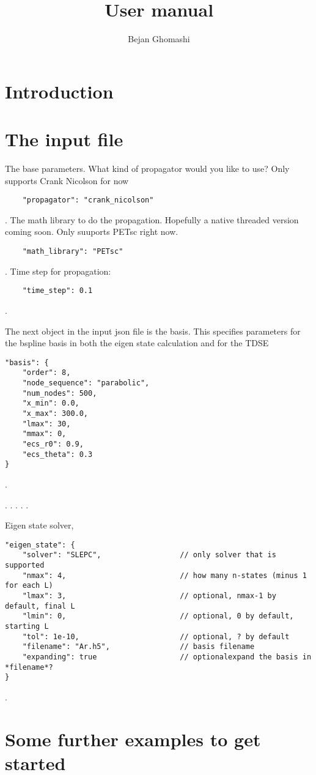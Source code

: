 \documentclass{memoir}
\title{User manual}
\author{Bejan Ghomashi}
\begin{document}
\maketitle

\tableofcontents

\newpage

\section{Introduction}

\cite{AbramowitzStegun}

\section{The input file}
The base parameters. What kind of propagator would you like to use? Only supports Crank Nicolson for now
\begin{lstlisting}
    "propagator": "crank_nicolson"
\end{lstlisting}.
The math library to do the propagation. Hopefully a native threaded version coming soon. Only suuports PETsc right now.
\begin{lstlisting}
    "math_library": "PETsc"
\end{lstlisting}.
Time step for propagation:
\begin{lstlisting}
    "time_step": 0.1
\end{lstlisting}.


The next object in the input json file is the basis. This specifies parameters for the bspline basis in both the eigen state calculation and for the TDSE

\begin{lstlisting}
"basis": {
    "order": 8,
    "node_sequence": "parabolic",
    "num_nodes": 500,
    "x_min": 0.0,
    "x_max": 300.0,
    "lmax": 30,
    "mmax": 0,
    "ecs_r0": 0.9,
    "ecs_theta": 0.3
}
\end{lstlisting}.


.
.
.
.
.

Eigen state solver,
\begin{lstlisting}
"eigen_state": {
    "solver": "SLEPC",                  // only solver that is supported
    "nmax": 4,                          // how many n-states (minus 1 for each L)
    "lmax": 3,                          // optional, nmax-1 by default, final L
    "lmin": 0,                          // optional, 0 by default, starting L
    "tol": 1e-10,                       // optional, ? by default
    "filename": "Ar.h5",                // basis filename
    "expanding": true                   // optionalexpand the basis in *filename*?
}
\end{lstlisting}.


\section{Some further examples to get started}





\end{document}
